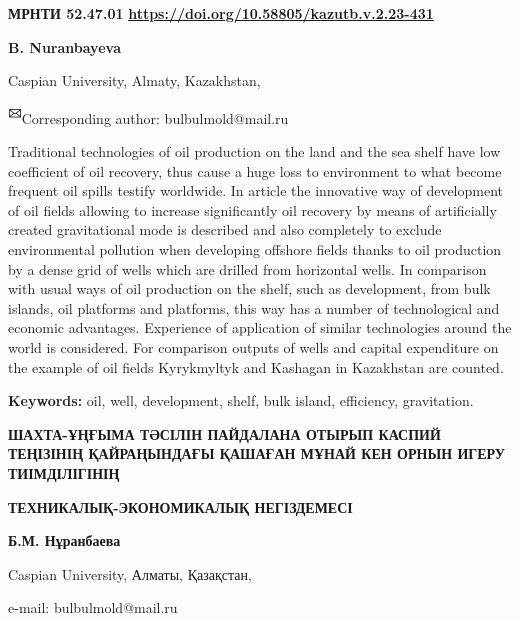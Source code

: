 \newpage
{\bfseries МРНТИ 52.47.01}
\hfill {\bfseries \href{https://doi.org/10.58805/kazutb.v.2.23-431}{https://doi.org/10.58805/kazutb.v.2.23-431}}


\begin{center}
{\bfseries B. Nuranbayeva}

Caspian University, Almaty, Kazakhstan,

{\bfseries \textsuperscript{🖂}}Corresponding author: bulbulmold@mail.ru
\end{center}

Traditional technologies of oil production on the land and the sea shelf
have low coefficient of oil recovery, thus cause a huge loss to
environment to what become frequent oil spills testify worldwide. In
article the innovative way of development of oil fields allowing to
increase significantly oil recovery by means of artificially created
gravitational mode is described and also completely to exclude
environmental pollution when developing offshore fields thanks to oil
production by a dense grid of wells which are drilled from horizontal
wells. In comparison with usual ways of oil production on the shelf,
such as development, from bulk islands, oil platforms and platforms,
this way has a number of technological and economic advantages.
Experience of application of similar technologies around the world is
considered. For comparison outputs of wells and capital expenditure on
the example of oil fields Kyrykmyltyk and Kashagan in Kazakhstan are
counted.

{\bfseries Keywords:} oil, well, development, shelf, bulk island,
efficiency, gravitation.

\begin{center}
{\large\bfseries ШАХТА-ҰҢҒЫМА ТӘСІЛІН ПАЙДАЛАНА ОТЫРЫП КАСПИЙ ТЕҢІЗІНІҢ
ҚАЙРАҢЫНДАҒЫ ҚАШАҒАН МҰНАЙ КЕН ОРНЫН ИГЕРУ ТИІМДІЛІГІНІҢ}

{\bfseries ТЕХНИКАЛЫҚ-ЭКОНОМИКАЛЫҚ НЕГІЗДЕМЕСІ}

{\bfseries Б.М. Нұранбаева}

Caspian University, Алматы, Қазақстан,

e-mail: bulbulmold@mail.ru
\end{center}

